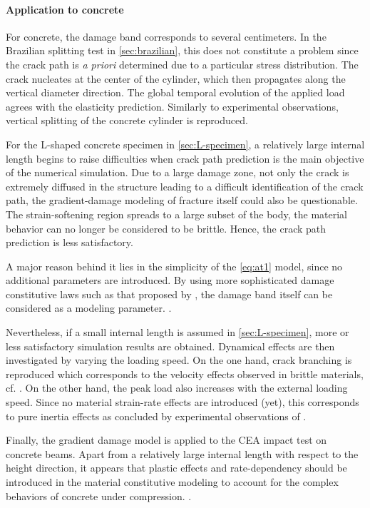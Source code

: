 \paragraph{Application to concrete} For concrete, the damage band corresponds to several centimeters. In the Brazilian splitting test in \cref{sec:brazilian}, this does not constitute a problem since the crack path is \emph{a priori} determined due to a particular stress distribution. The crack nucleates at the center of the cylinder, which then propagates along the vertical diameter direction. The global temporal evolution of the applied load agrees with the elasticity prediction. Similarly to experimental observations, vertical splitting of the concrete cylinder is reproduced.

For the L-shaped concrete specimen in \cref{sec:L-specimen}, a relatively large internal length begins to raise difficulties when crack path prediction is the main objective of the numerical simulation. Due to a large damage zone, not only the crack is extremely diffused in the structure leading to a difficult identification of the crack path, the gradient-damage modeling of fracture itself could also be questionable. The strain-softening region spreads to a large subset of the body, the material behavior can no longer be considered to be brittle. Hence, the crack path prediction is less satisfactory.

A major reason behind it lies in the simplicity of the \eqref{eq:at1} model, since no additional parameters are introduced. By using more sophisticated damage constitutive laws such as that proposed by \cite{LorentzGodard:2011}, the damage band itself can be considered as a modeling parameter. .

Nevertheless, if a small internal length is assumed in \cref{sec:L-specimen}, more or less satisfactory simulation results are obtained. Dynamical effects are then investigated by varying the loading speed. On the one hand, crack branching is reproduced which corresponds to the velocity effects observed in brittle materials, cf. \cite{Schardin:2012}. On the other hand, the peak load also increases with the external loading speed. Since no material strain-rate effects are introduced (yet), this corresponds to pure inertia effects as concluded by experimental observations of \cite{OzboltBedeSharmaMayer:2015}.

Finally, the gradient damage model is applied to the CEA impact test on concrete beams. Apart from a relatively large internal length with respect to the height direction, it appears that plastic effects and rate-dependency should be introduced in the material constitutive modeling to account for the complex behaviors of concrete under compression. .
